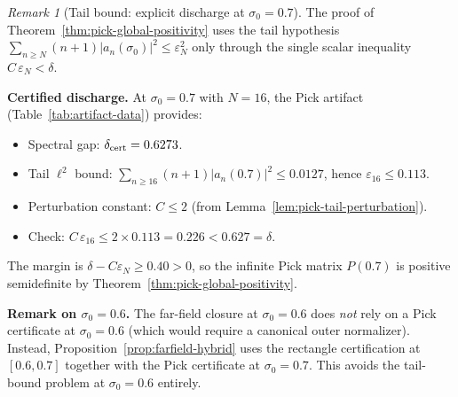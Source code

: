 \documentclass[11pt]{article}
\theoremstyle{definition}
\theoremstyle{remark}
\newtheorem{remark}[theorem]{Remark}
\theoremstyle{definition}
\begin{document}
\begin{remark}[Tail bound: explicit discharge at $\sigma_0=0.7$]\label{rem:pick-tail-artifact}
The proof of Theorem~\ref{thm:pick-global-positivity} uses the tail hypothesis
\(\sum_{n\ge N} (n+1)|a_n(\sigma_0)|^2\le \varepsilon_N^2\)
only through the single scalar inequality \(C\,\varepsilon_N<\delta\).

\textbf{Certified discharge.} 
At $\sigma_0 = 0.7$ with $N=16$, the Pick artifact (Table~\ref{tab:artifact-data}) provides:
\begin{itemize}
\item Spectral gap: $\delta_{\rm cert} = 0.6273$.
\item Tail $\ell^2$ bound: $\sum_{n\ge 16}(n+1)|a_n(0.7)|^2 \le 0.0127$, hence $\varepsilon_{16} \le 0.113$.
\item Perturbation constant: $C \le 2$ (from Lemma~\ref{lem:pick-tail-perturbation}).
\item Check: $C\,\varepsilon_{16} \le 2 \times 0.113 = 0.226 < 0.627 = \delta$.
\end{itemize}
The margin is $\delta - C\varepsilon_N \ge 0.40 > 0$, so the infinite Pick matrix $P(0.7)$ is positive semidefinite by Theorem~\ref{thm:pick-global-positivity}.

\textbf{Remark on $\sigma_0 = 0.6$.}
The far-field closure at $\sigma_0 = 0.6$ does \emph{not} rely on a Pick certificate at $\sigma_0 = 0.6$ (which would require a canonical outer normalizer). 
Instead, Proposition~\ref{prop:farfield-hybrid} uses the rectangle certification at $[0.6, 0.7]$ together with the Pick certificate at $\sigma_0 = 0.7$. 
This avoids the tail-bound problem at $\sigma_0 = 0.6$ entirely.
\end{remark}
\end{document}
